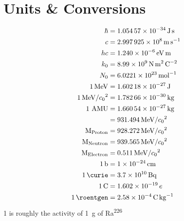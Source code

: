 \section{Units \& Conversions}
\begin{align*}
\hbar & = \SI{1.05457e-34}{\joule\second} \\
c & = \SI{2.997925e8}{\meter\per\second} \\
h c & = \SI{1.240e-6}{\electronvolt\meter} \\
k_0 & = \SI{8.99e9}{\newton\square\meter\per\square\coulomb} \\
N_0 & = \SI{6.0221e23}{\per\mole} \\
\SI{1}{\mega\electronvolt} & = \SI{1.60218e-27}{\joule} \\
\SI[per-mode=symbol]{1}{\mega\eV\per\clight\squared} & = \SI{1.78266e-30}{\kilo\gram} \\
1~\text{AMU} & = \SI{1.66054e-27}{\kilo\gram} \\
\quad & = \SI[per-mode=symbol]{931.494}{\mega\eV\per\clight\squared} \\
\text{M}_\text{Proton} & = \SI[per-mode=symbol]{928.272}{\mega\eV\per\clight\squared} \\
\text{M}_\text{Neutron} & = \SI[per-mode=symbol]{939.565}{\mega\eV\per\clight\squared} \\
\text{M}_\text{Electron} & = \SI[per-mode=symbol]{0.511}{\mega\eV\per\clight\squared} \\
\SI{1}{\barn} & = \SI{1e-24}{\cm} \\
\SI{1}{\curie} & = \SI{3.7e10}{\becquerel} \\
\SI{1}{\coulomb} & = \SI{1.602e-19}{\elementarycharge} \\
\SI{1}{\roentgen} & = \SI{2.58e-4}{\coulomb\per\kilo\gram}
\end{align*}
\SI{1}{\curie} is roughly the activity of \SI{1}{\gram} of Ra\textsuperscript{226}